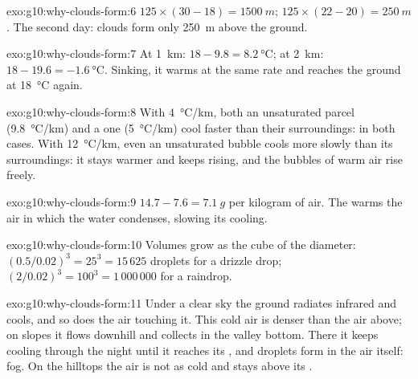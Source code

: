 \begin{solution}{exo:g10:why-clouds-form:6}
$125 \times (30 - 18) = \qty{1500}{m}$; $125 \times (22 - 20) =
\qty{250}{m}$. The second day: clouds form only \qty{250}{m} above the
ground.
\end{solution}

\begin{solution}{exo:g10:why-clouds-form:7}
At \qty{1}{km}: $18 - 9.8 = \qty{8.2}{\degreeCelsius}$; at \qty{2}{km}:
$18 - 19.6 = \qty{-1.6}{\degreeCelsius}$. Sinking, it warms at the same rate
and reaches the ground at \qty{18}{\degreeCelsius} again.
\end{solution}

\begin{solution}{exo:g10:why-clouds-form:8}
With \qty{4}{\degreeCelsius/km}, both an unsaturated parcel
(\qty{9.8}{\degreeCelsius/km}) and a  one
(\qty{5}{\degreeCelsius/km}) cool faster than their surroundings:  in
both cases. With \qty{12}{\degreeCelsius/km}, even an unsaturated bubble
cools more slowly than its surroundings: it stays warmer and keeps rising,
and the bubbles of warm air rise freely.
\end{solution}

\begin{solution}{exo:g10:why-clouds-form:9}
$14.7 - 7.6 = \qty{7.1}{g}$ per kilogram of air. The  warms the
air in which the water condenses, slowing its cooling.
\end{solution}

\begin{solution}{exo:g10:why-clouds-form:10}
Volumes grow as the cube of the diameter: $(0.5/0.02)^3 = 25^3 = 15\,625$
droplets for a drizzle drop; $(2/0.02)^3 = 100^3 = 1\,000\,000$ for a
raindrop.
\end{solution}

\begin{solution}{exo:g10:why-clouds-form:11}
Under a clear sky the ground radiates infrared and cools, and so does the
air touching it. This cold air is denser than the air above; on slopes it
flows downhill and collects in the valley bottom. There it keeps cooling
through the night until it reaches its , and droplets form in the
air itself: fog. On the hilltops the air is not as cold and stays above its
.
\end{solution}

